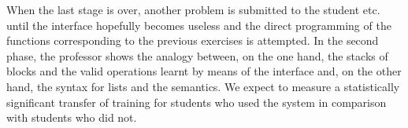 When the last stage is over, another problem is submitted to the
student etc. until the interface hopefully becomes useless and the
direct programming of the \erlang functions corresponding to the
previous exercises is attempted. In the second phase, the professor
shows the analogy between, on the one hand, the stacks of blocks and
the valid operations learnt by means of the interface and, on the
other hand, the \erlang syntax for lists and the \erlang semantics. We
expect to measure a statistically significant transfer of training for
students who used the system in comparison with students who did not.

